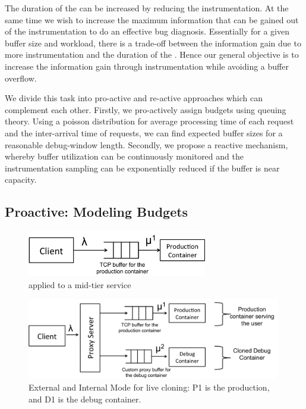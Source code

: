 The duration of the \debugwindow can be increased by reducing the instrumentation.
At the same time we wish to increase the maximum information that can be gained out of the instrumentation to do an effective bug diagnosis.
Essentially for a given buffer size and workload, there is a trade-off between the information gain due to more instrumentation and the duration of the \debugwindow.
Hence our general objective is to increase the information gain through instrumentation while avoiding a buffer overflow.

We divide this task into  pro-active and re-active approaches which can complement each other. Firstly, we pro-actively assign budgets using queuing theory. 
Using a poisson distribution for average processing time of each request and the inter-arrival time of requests, we can find expected buffer sizes for a reasonable debug-window length. 
Secondly, we propose a reactive mechanism, whereby buffer utilization can be continuously monitored and the instrumentation sampling can be exponentially reduced if the buffer is near capacity. 

\subsection{Proactive: Modeling Budgets}
\label{sec:activeProactiveModeling}


\begin{figure}[t!]

		\centering
		\includegraphics[width=0.7\textwidth]{queue/figs/queue.pdf}
		\caption{\parikshan applied to a mid-tier service}
		\label{fig:queueModel}
\end{figure}
\begin{figure}
		\centering
		\includegraphics[width=0.99\textwidth]{queue/figs/queueCloned.pdf}
		\caption{External and Internal Mode for live cloning: P1 is the production, and D1 is the debug container.}
		\label{fig:queueClonedModel}
\end{figure}
	
